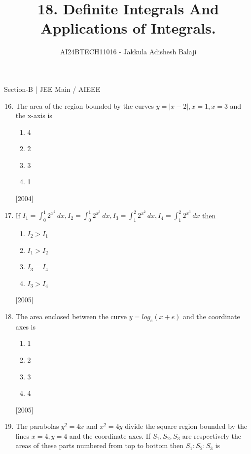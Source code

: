 \documentclass[journal,12pt,twocolumn]{IEEEtran}
\theoremstyle{remark}
\begin{document}
	
	\vspace{3cm}

	\title{18. Definite Integrals And Applications of Integrals.}
	\author{AI24BTECH11016 - Jakkula Adishesh Balaji}
	\maketitle
	\newpage
	\bigskip

	\renewcommand{\thefigure}{\theenumi}
	\renewcommand{\thetable}{\theenumi}

	Section-B | JEE Main / AIEEE
	\begin{enumerate}
    \setcounter{enumi}{15}
	      \item 
		      The area of the region bounded by the curves $y=|x-2|, x=1, x=3$ and the x-axis is
		     \begin{enumerate}
		              \item 4
		              \item 2
		              \item 3
		              \item 1
		     \end{enumerate}
		     \hfill [2004] 
	      \item
           If $I_1=\int_{0}^{1} 2^{x^{2}} \,dx,I_2=\int_{0}^{1} 2^{x^{3}} \,dx,I_3=\int_{1}^{2} 2^{x^{2}} \,dx, I_4=\int_{1}^{2} 2^{x^{3}} \, dx
          $ then 
          \begin{enumerate}
                   \item $I_2>I_1$
                   \item $I_1>I_2$
                   \item $I_3=I_4$
                   \item $I_3>I_4$
          \end{enumerate}
          \hfill [2005]
	      \item
		      The area enclosed between the curve $y=log_e(x+e)$ and the coordinate  axes is 
		     \begin{enumerate}
		              \item 1
		              \item 2
		              \item 3
		              \item 4
		     \end{enumerate}
		     \hfill [2005] 
	      \item 
		      The parabolas $y^{2}=4x$ and $x^{2}=4y$ divide the square region bounded by the lines $x=4, y=4$ and the coordinate axes. If $S_1, S_2, S_3$ are respectively the areas of these parts numbered from top to bottom then $S_1:S_2:S_3$ is 

\end{enumerate}
\end{document}
